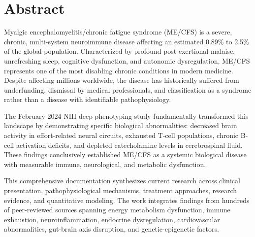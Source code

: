 \chapter*{Abstract}

Myalgic encephalomyelitis/chronic fatigue syndrome (ME/CFS) is a severe, chronic, multi-system neuroimmune disease affecting an estimated 0.89\% to 2.5\% of the global population. Characterized by profound post-exertional malaise, unrefreshing sleep, cognitive dysfunction, and autonomic dysregulation, ME/CFS represents one of the most disabling chronic conditions in modern medicine. Despite affecting millions worldwide, the disease has historically suffered from underfunding, dismissal by medical professionals, and classification as a syndrome rather than a disease with identifiable pathophysiology.

The February 2024 NIH deep phenotyping study fundamentally transformed this landscape by demonstrating specific biological abnormalities: decreased brain activity in effort-related neural circuits, exhausted T-cell populations, chronic B-cell activation deficits, and depleted catecholamine levels in cerebrospinal fluid. These findings conclusively established ME/CFS as a systemic biological disease with measurable immune, neurological, and metabolic dysfunction.

This comprehensive documentation synthesizes current research across clinical presentation, pathophysiological mechanisms, treatment approaches, research evidence, and quantitative modeling. The work integrates findings from hundreds of peer-reviewed sources spanning energy metabolism dysfunction, immune exhaustion, neuroinflammation, endocrine dysregulation, cardiovascular abnormalities, gut-brain axis disruption, and genetic-epigenetic factors.

